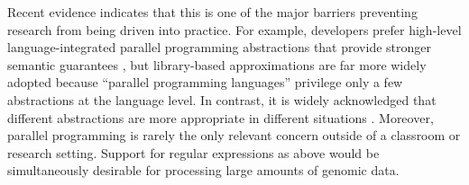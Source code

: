
Recent evidence indicates that this is one of the major barriers preventing research  from being driven into practice. For example, developers prefer high-level language-integrated parallel programming abstractions that provide  stronger semantic guarantees  \cite{cave2010comparing}, but library-based approximations are far more widely adopted because  ``parallel programming languages'' privilege only a few  abstractions at the language level. In contrast, it is widely acknowledged that  different abstractions are more appropriate in different situations \cite{Tasharofi:2013rc}. Moreover,  parallel programming is rarely the only relevant concern outside of a classroom or research setting. Support for regular expressions as above would be simultaneously desirable for processing large amounts of genomic data.%


